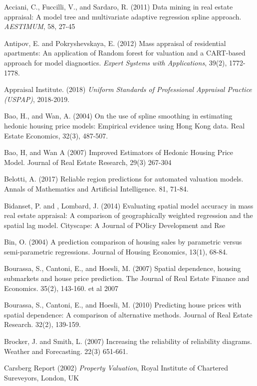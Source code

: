 \documentclass[colTwo]{anon}
\theoremstyle{definition}
\begin{document}
\begin{thebibliography}{50}			
\harvarditem{}{}{}Acciani, C., Fuccilli, V., and Sardaro, R. (2011) Data mining in real estate appraisal: A model tree and multivariate adaptive regression spline approach. \textit{AESTIMUM}, 58, 27-45

\harvarditem{}{}{}Antipov, E. and Pokryshevskaya, E. (2012) Mass appraisal of residential apartments: An application of Random forest for valuation and a CART-based approach for model diagnostics. \textit{Expert Systems with Applications}, 39(2), 1772-1778.

\harvarditem{}{}{}Appraisal Institute. (2018) \textit{Uniform Standards of Professional Appraisal Practice (USPAP)}, 2018-2019.

\harvarditem{}{}{}Bao, H., and Wan, A. (2004) On the use of spline smoothing in estimating hedonic housing price models: Empirical evidence using Hong Kong data. Real Estate Economics, 32(3), 487-507. 

\harvarditem{}{}{}Bao, H, and Wan A (2007) Improved Estimators of Hedonic Housing Price Model. Journal of Real Estate Research, 29(3) 267-304

\harvarditem{}{}{}Belotti, A. (2017) Reliable region predictions for automated valuation models. Annals of Mathematics and Artificial Intelligence. 81, 71-84. 

\harvarditem{}{}{}Bidanset, P. and , Lombard, J. (2014) Evaluating spatial model accuracy in mass real estate appraisal: A comparison of geographically weighted regression and the spatial lag model. Cityscape: A Journal of POlicy Development and Rse

\harvarditem{}{}{}Bin, O. (2004) A prediction comparison of housing sales by parametric versus semi-parametric regressions. Journal of Housing Economics, 13(1), 68-84. 

\harvarditem{}{}{}Bourassa, S., Cantoni, E., and Hoesli, M. (2007) Spatial dependence, housing submarkets and house price prediction. The Journal of Real Estate Finance and Economics. 35(2), 143-160.  et al 2007

\harvarditem{}{}{}Bourassa, S., Cantoni, E., and Hoesli, M. (2010) Predicting house prices with spatial dependence: A comparison of alternative methods. Journal of Real Estate Research. 32(2), 139-159. 

\harvarditem{}{}{}Brocker, J. and Smith, L. (2007) Increasing the reliability of reliability diagrams. Weather and Forecasting. 22(3) 651-661. 

\harvarditem{}{}{}Carsberg Report (2002) \textit{Property Valuation}, Royal Institute of Chartered Sureveyors, London, UK


\end{thebibliography}
\end{document}
